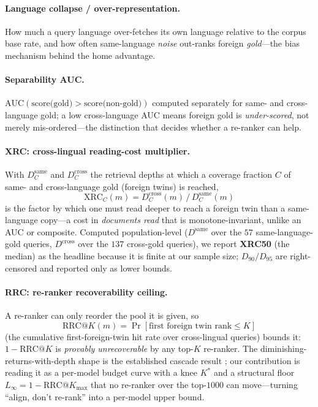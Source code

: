 \documentclass[11pt]{article}
\begin{document}
\paragraph{Language collapse / over-representation.}
How much a query language over-fetches its own language relative to the corpus
base rate, and how often same-language \emph{noise} out-ranks foreign
\emph{gold}---the bias mechanism behind the home advantage.

\paragraph{Separability AUC.}
$\mathrm{AUC}(\text{score(gold)}>\text{score(non-gold)})$ computed separately for
same- and cross-language gold; a low cross-language AUC means foreign gold is
\emph{under-scored}, not merely mis-ordered---the distinction that decides
whether a re-ranker can help.

\paragraph{XRC: cross-lingual reading-cost multiplier.}
With $D_C^{\text{same}}$ and $D_C^{\text{cross}}$ the retrieval depths at which a
coverage fraction $C$ of same- and cross-language gold (foreign twins) is reached,
\begin{equation}
\label{eq:xrc}
\mathrm{XRC}_C(m) = D_C^{\text{cross}}(m) \,/\, D_C^{\text{same}}(m)
\end{equation}
is the factor by which one must read deeper to reach a foreign twin than a
same-language copy---a cost in \emph{documents read} that is monotone-invariant,
unlike an AUC or composite. Computed population-level ($D^{\text{same}}$ over the
$57$ same-language-gold queries, $D^{\text{cross}}$ over the $137$ cross-gold
queries), we report \textbf{XRC50} (the median) as the headline because it is
finite at our sample size; $D_{90}/D_{95}$ are right-censored and reported only as
lower bounds.

\paragraph{RRC: re-ranker recoverability ceiling.}
A re-ranker can only reorder the pool it is given, so
\begin{equation}
\label{eq:rrc}
\mathrm{RRC@}K(m) = \Pr\!\left[\text{first foreign twin rank} \le K\right]
\end{equation}
(the cumulative first-foreign-twin hit rate over cross-lingual queries) bounds it:
$1-\mathrm{RRC@}K$ is \emph{provably unrecoverable} by any top-$K$ re-ranker. The
diminishing-returns-with-depth shape is the established cascade result
\citep{nogueira2019multistage,gao2021rethink}; our contribution is reading it as
a per-model budget curve with a knee $K^{\!*}$ and a structural floor
$L_\infty = 1-\mathrm{RRC@}K_{\max}$ that no re-ranker over the top-$1000$ can
move---turning ``align, don't re-rank'' into a per-model upper bound.
\end{document}
